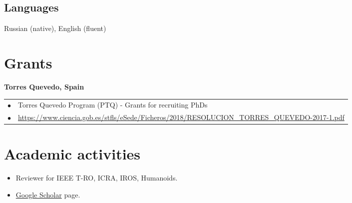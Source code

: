\documentclass[a4paper,10pt]{report}
\begin{document}
\begin{adjustwidth}{0.5cm}{0pt}
\subsection{Languages}
\begin{adjustwidth}{0.5cm}{0pt}
    Russian (native), English (fluent)
\end{adjustwidth}
\end{adjustwidth}


\vspace{0.15cm}
\section{Grants}
\begin{adjustwidth}{1.0cm}{0pt}
    {\bf {} Torres Quevedo, Spain} \\
        \begin{tabularx}{\linewidth}{l X}
            \hfill $\bullet$    &   Torres Quevedo Program (PTQ) - Grants for recruiting PhDs \\
            \hfill $\bullet$    &   \url{https://www.ciencia.gob.es/stfls/eSede/Ficheros/2018/RESOLUCION_TORRES_QUEVEDO-2017-1.pdf}
        \end{tabularx}
\end{adjustwidth}


\vspace{0.15cm}
\section{Academic activities}
\begin{itemize}
    \item Reviewer for IEEE T-RO, ICRA, IROS, Humanoids.
    \item \href{https://scholar.google.fr/citations?user=yVOvGd0AAAAJ&hl=en}{Google Scholar} page.
\end{itemize}
\end{document}

